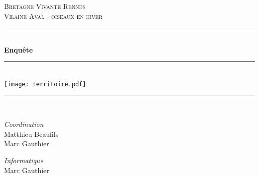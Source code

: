 \documentclass[a4paper,twoside,english]{article}
\newcommand{\HRule}{\rule{\linewidth}{0.5mm}}
\begin{document}
%
\begin{titlepage}
  \begin{sffamily}
  \begin{center}



    \textsc{\LARGE Bretagne Vivante Rennes}\\[1cm]
    \textsc{\Large Vilaine Aval - oiseaux en hiver}\\[1cm]

    \HRule \\[0.4cm]
    { \huge \bfseries Enquête}
    \HRule \\[0.4cm]
    \texttt{[image: territoire.pdf]}~\\[.5cm]
    \HRule \\[0.4cm]
    \begin{minipage}{0.4\textwidth}
      \begin{flushleft} \large
        \emph{Coordination}\\
        Matthieu Beaufils\\
         Marc Gauthier
      \end{flushleft}
    \end{minipage}
    \begin{minipage}{0.4\textwidth}
      \begin{flushright} \large
        \emph{Informatique}\\
        Marc Gauthier
      \end{flushright}
    \end{minipage}

    \vfill
  \end{center}
  \end{sffamily}
\end{titlepage}
\setlength{\parskip}{0pt} %
\setlength{\parindent}{0pt}
\twocolumn

\onecolumn
\end{document}
